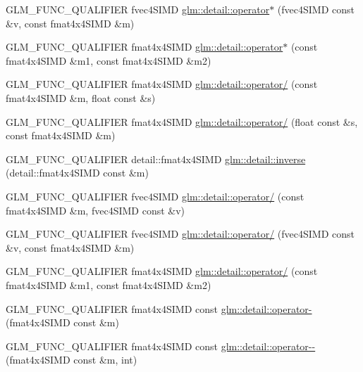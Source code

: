 \begin{DoxyCompactItemize}
\item 
G\+L\+M\+\_\+\+F\+U\+N\+C\+\_\+\+Q\+U\+A\+L\+I\+F\+I\+E\+R fvec4\+S\+I\+M\+D \hyperlink{namespaceglm_1_1detail_a0f6596e928f7dc3fb62a38bb5df08d18}{glm\+::detail\+::operator$\ast$} (fvec4\+S\+I\+M\+D const \&v, const fmat4x4\+S\+I\+M\+D \&m)
\item 
G\+L\+M\+\_\+\+F\+U\+N\+C\+\_\+\+Q\+U\+A\+L\+I\+F\+I\+E\+R fmat4x4\+S\+I\+M\+D \hyperlink{namespaceglm_1_1detail_a628d3f0d2c16d6207ca18a11ad66261c}{glm\+::detail\+::operator$\ast$} (const fmat4x4\+S\+I\+M\+D \&m1, const fmat4x4\+S\+I\+M\+D \&m2)
\item 
G\+L\+M\+\_\+\+F\+U\+N\+C\+\_\+\+Q\+U\+A\+L\+I\+F\+I\+E\+R fmat4x4\+S\+I\+M\+D \hyperlink{namespaceglm_1_1detail_aa8f3ac302faac4a9d5c0e49321ccf9cb}{glm\+::detail\+::operator/} (const fmat4x4\+S\+I\+M\+D \&m, float const \&s)
\item 
G\+L\+M\+\_\+\+F\+U\+N\+C\+\_\+\+Q\+U\+A\+L\+I\+F\+I\+E\+R fmat4x4\+S\+I\+M\+D \hyperlink{namespaceglm_1_1detail_a33235564824caa327d104e227bc64045}{glm\+::detail\+::operator/} (float const \&s, const fmat4x4\+S\+I\+M\+D \&m)
\item 
G\+L\+M\+\_\+\+F\+U\+N\+C\+\_\+\+Q\+U\+A\+L\+I\+F\+I\+E\+R detail\+::fmat4x4\+S\+I\+M\+D \hyperlink{namespaceglm_1_1detail_a4d5c895b3548f6c8296fd6a9980fe3e1}{glm\+::detail\+::inverse} (detail\+::fmat4x4\+S\+I\+M\+D const \&m)
\item 
G\+L\+M\+\_\+\+F\+U\+N\+C\+\_\+\+Q\+U\+A\+L\+I\+F\+I\+E\+R fvec4\+S\+I\+M\+D \hyperlink{namespaceglm_1_1detail_a9041c53e82c0b0191b24185e14e2b55f}{glm\+::detail\+::operator/} (const fmat4x4\+S\+I\+M\+D \&m, fvec4\+S\+I\+M\+D const \&v)
\item 
G\+L\+M\+\_\+\+F\+U\+N\+C\+\_\+\+Q\+U\+A\+L\+I\+F\+I\+E\+R fvec4\+S\+I\+M\+D \hyperlink{namespaceglm_1_1detail_a147045f9002e1195039f968a2396c435}{glm\+::detail\+::operator/} (fvec4\+S\+I\+M\+D const \&v, const fmat4x4\+S\+I\+M\+D \&m)
\item 
G\+L\+M\+\_\+\+F\+U\+N\+C\+\_\+\+Q\+U\+A\+L\+I\+F\+I\+E\+R fmat4x4\+S\+I\+M\+D \hyperlink{namespaceglm_1_1detail_ace681b03cfb7d72e2633dc06d4cee962}{glm\+::detail\+::operator/} (const fmat4x4\+S\+I\+M\+D \&m1, const fmat4x4\+S\+I\+M\+D \&m2)
\item 
G\+L\+M\+\_\+\+F\+U\+N\+C\+\_\+\+Q\+U\+A\+L\+I\+F\+I\+E\+R fmat4x4\+S\+I\+M\+D const \hyperlink{namespaceglm_1_1detail_a7f0cc16af5799679034230c9cea81b10}{glm\+::detail\+::operator-\/} (fmat4x4\+S\+I\+M\+D const \&m)
\item 
G\+L\+M\+\_\+\+F\+U\+N\+C\+\_\+\+Q\+U\+A\+L\+I\+F\+I\+E\+R fmat4x4\+S\+I\+M\+D const \hyperlink{namespaceglm_1_1detail_a37b1c3ee6bcd2c5e56d49e2ea90f4ee5}{glm\+::detail\+::operator-\/-\/} (fmat4x4\+S\+I\+M\+D const \&m, int)

\end{DoxyCompactItemize}
